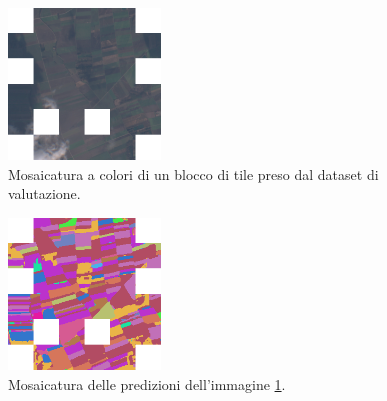 \begin{multicols}{2}
{
    \begin{figure}[H]
        \centering
        \includegraphics[width=0.36\textwidth]{Immagini/sperimentazione/ESEMPIO_MOSICATURA_2_INPUT_2.png}
        \caption{Mosaicatura a colori di un blocco di tile preso dal dataset di valutazione.}
        \label{fig:MOSAIC_RGB_5}
    \end{figure}
}
{
    \begin{figure}[H]
        \centering
        \includegraphics[width=0.36\textwidth]{Immagini/sperimentazione/ESEMPIO_MOSICATURA_2_PRED_2.png}
        \caption{Mosaicatura delle predizioni dell'immagine \ref{fig:MOSAIC_RGB_5}.}
    \end{figure}
}
\end{multicols}

